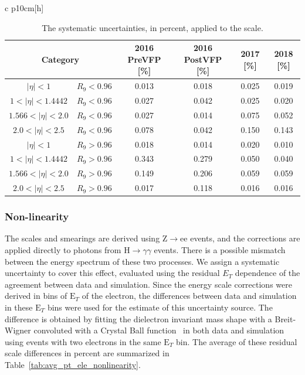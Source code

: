 \begin{table}{ c p{10cm}}[h]
    \centering
    \begin{tabular}{c c c c c c}
        \multicolumn{2}{c}{Category} & 2016 PreVFP [\%] & 2016 PostVFP [\%] & 2017 [\%] & 2018 [\%]  \\ \hline \hline
        $|\eta| < 1$ & $R_9 < 0.96$ & 0.013 & 0.018 & 0.025 & 0.019 \\ \hline
        $1 < |\eta| < 1.4442$ & $R_9 < 0.96$ & 0.027 & 0.042 & 0.025 & 0.020 \\ \hline
        $1.566 < |\eta| < 2.0$ & $R_9 < 0.96$ & 0.027 & 0.014 & 0.075 & 0.052 \\ \hline
        $2.0 < |\eta| < 2.5$ & $R_9 < 0.96$ & 0.078 & 0.042 & 0.150 & 0.143 \\ \hline
        $|\eta| < 1$ & $R_9 > 0.96$ & 0.018 & 0.014 & 0.020 & 0.010 \\ \hline
        $1 < |\eta| < 1.4442$ & $R_9 > 0.96$ & 0.343 & 0.279 & 0.050 & 0.040 \\ \hline
        $1.566 < |\eta| < 2.0$ & $R_9 > 0.96$ & 0.149 & 0.206 & 0.059 & 0.059 \\ \hline
        $2.0 < |\eta| < 2.5$ & $R_9 > 0.96$ & 0.017 & 0.118 & 0.016 & 0.016 \\ \hline
    \end{tabular}
    \caption[Scale uncertainties]{The systematic uncertainties, in percent, applied to the scale. }
    \label{tab:syst_unc_scales_smearings}
\end{table}

\subsubsection{Non-linearity}

The scales and smearings are derived using Z$\rightarrow$ee events, and the corrections are applied directly to photons from H$\rightarrow\gamma\gamma$ events. There is a possible mismatch between the energy spectrum of these two processes. We assign a systematic uncertainty to cover this effect, evaluated using the residual $E_T$ dependence of the agreement between data and simulation. Since the energy scale corrections were derived in bins of $\mathrm{E}_{T}$ of the electron, the differences between data and simulation in these $\mathrm{E}_{T}$ bins were used for the estimate of this uncertainty source. The difference is obtained by fitting the dielectron invariant mass shape with a Breit-Wigner convoluted with a Crystal Ball function~\cite{crystal_ball} in both data and simulation using events with two electrons in the same $\mathrm{E}_{T}$ bin. The average of these residual scale differences in percent are summarized in Table~\ref{tab:avg_pt_ele_nonlinearity}.

